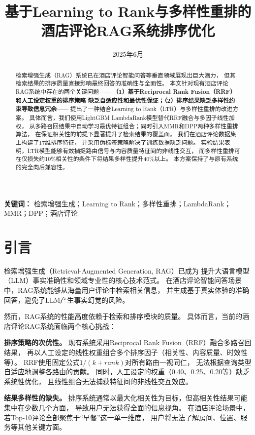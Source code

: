 \documentclass[10pt,a4paper]{article}
\title{\textbf{基于Learning to Rank与多样性重排的\\酒店评论RAG系统排序优化}}
\author{
}
\date{2025年6月}
\begin{document}
\maketitle

\begin{abstract}
检索增强生成（RAG）系统已在酒店评论智能问答等垂直领域展现出巨大潜力，
但其检索结果的排序质量直接影响最终回答的准确性与全面性。
本文针对现有酒店评论RAG系统中存在的两个关键问题——
\textbf{（1）基于Reciprocal Rank Fusion（RRF）和人工设定权重的排序策略
缺乏自适应性和最优性保证；（2）排序结果缺乏多样性约束导致信息冗余}——
提出了一种结合Learning to Rank（LTR）与多样性重排的改进方案。
具体而言，我们使用LightGBM LambdaRank模型替代RRF融合与多因子线性加权，
从多路召回结果中自动学习最优特征组合；同时引入MMR和DPP两种多样性重排算法，
在保证相关性的前提下显著提升了检索结果的覆盖面。
我们在酒店评论数据集上构建了17维排序特征，
并采用伪标签策略解决了训练数据缺乏问题。
实验结果表明，LTR模型能够有效捕捉路由信号与内容质量特征间的非线性交互，
而多样性重排可在仅损失约10\%相关性的条件下将结果多样性提升40\%以上。
本方案保持了与原有系统的完全向后兼容性。
\end{abstract}

\textbf{关键词：} 检索增强生成；Learning to Rank；多样性重排；LambdaRank；MMR；DPP；酒店评论

\section{引言}

检索增强生成（Retrieval-Augmented Generation, RAG）\cite{lewis2020rag}已成为
提升大语言模型（LLM）事实准确性和领域专业性的核心技术范式。
在酒店评论智能问答场景中，RAG系统能够从海量用户评论中检索相关信息，
并生成基于真实体验的准确回答，避免了LLM产生事实幻觉的风险\cite{gao2023rag}。

然而，RAG系统的性能高度依赖于检索和排序模块的质量\cite{cuconasu2024rag}。
具体而言，当前的酒店评论RAG系统面临两个核心挑战：

\textbf{排序策略的次优性。}
现有系统采用Reciprocal Rank Fusion（RRF）\cite{cormack2009rrf}融合多路召回结果，
再以人工设定的线性权重组合多个排序因子（相关性、内容质量、时效性等）。
RRF使用固定公式$1/(k+rank)$对所有路由一视同仁，
无法根据查询类型自适应地调整各路由的贡献。
同时，人工设定的权重（0.40、0.25、0.20等）缺乏系统性优化，
且线性组合无法捕获特征间的非线性交互效应。

\textbf{结果多样性的缺失。}
排序系统通常以最大化相关性为目标，但高相关性结果可能集中在少数几个方面，
导致用户无法获得全面的信息视角。
在酒店评论场景中，若Top-10评论全部聚焦于``早餐''这一单一维度，
用户将无法了解房间、位置、服务等其他关键方面。
\end{document}
